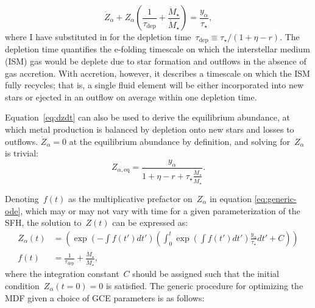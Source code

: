 \documentclass[12pt]{article}
\newcommand{\ddfrac}[2]{\frac{\displaystyle{#1}}{\displaystyle{#2}}}
\newcommand{\timescale}[1]{\ensuremath{\tau_\text{#1}}}
\begin{document}
\begin{equation}
\dot{Z}_\alpha + Z_\alpha\left(\frac{1}{\timescale{dep}} +
\frac{\ddot{M}_\star}{\dot{M}_\star}\right) = \frac{y_\alpha}{\tau_\star},
\label{eq:generic-ode}
\end{equation}
where I have substituted in for the depletion time~$\timescale{dep} \equiv
\tau_\star / (1 + \eta - r)$.
The depletion time quantifies the e-folding timescale on which the interstellar
medium (ISM) gas would be deplete due to star formation and outflows in the
absence of gas accretion.
With accretion, however, it describes a timescale on which the ISM fully
recycles; that is, a single fluid element will be either incorporated into new
stars or ejected in an outflow on average within one depletion time.
\par
Equation~\ref{eq:dzdt} can also be used to derive the equilibrium abundance,
at which metal production is balanced by depletion onto new stars and losses to
outflows.
$\dot{Z}_\alpha = 0$ at the equilibrium abundance by definition, and solving
for~$Z_\alpha$ is trivial:
\begin{equation}
Z_{\alpha,\text{eq}} = \ddfrac{y_\alpha}{
	1 + \eta - r + \tau_\star \frac{\ddot{M}_\star}{\dot{M}_\star}
}.
\end{equation}
\par
Denoting~$f(t)$ as the multiplicative prefactor on~$Z_\alpha$ in equation
\ref{eq:generic-ode}, which may or may not vary with time for a given
parameterization of the SFH, the solution to~$Z(t)$ can be expressed as:
\begin{subequations}\begin{align}
Z_\alpha(t) &= \left(
\exp\left(-\int f(t') dt'\right) \left(\int_0^t \exp\left(\int f(t') dt'\right)
\frac{y_\alpha}{\tau_\star}dt' + C\right)
\right)
\label{eq:generic-ode-solution}
\\
f(t) &= \frac{1}{\timescale{dep}} + \frac{\ddot{M}_\star}{\dot{M}_\star},
\label{eq:f}
\end{align}\end{subequations}
where the integration constant~$C$ should be assigned such that the initial
condition~$Z_\alpha(t = 0) = 0$ is satisfied.
The generic procedure for optimizing the MDF given a choice of GCE parameters
is as follows:
\end{document}

